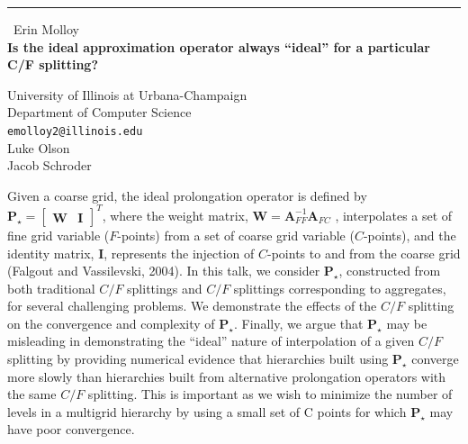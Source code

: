 \documentclass{report}
\begin{document}
\begin{center}
\rule{6in}{1pt} \
{\large Erin Molloy \\
{\bf Is the ideal approximation operator always ``ideal'' for a particular C/F splitting?}}

University of Illinois at Urbana-Champaign \\ Department of Computer Science
\\
{\tt emolloy2@illinois.edu}\\
Luke Olson\\
Jacob Schroder\end{center}

Given a coarse grid, the ideal prolongation operator is defined by
$\mathbf{P}_\star = \begin{bmatrix} \mathbf{W} & \mathbf{I} \end{bmatrix}^T$,
where the weight matrix, $\mathbf{W} = \mathbf{A}_{FF}^{-1} \mathbf{A}_{FC}$ ,
interpolates a set of fine grid variable ($F$-points) from a set of coarse grid variable
($C$-points), and the identity matrix, $\mathbf{I}$, represents the
injection of $C$-points to and from the coarse grid (Falgout and
Vassilevski, 2004).
In this talk, we consider $\mathbf{P}_\star$, constructed from
both traditional $C/F$ splittings and $C/F$ splittings corresponding to
aggregates, for several challenging problems. We demonstrate the effects of the
$C/F$ splitting on the convergence and complexity of $\mathbf{P}_\star$.
Finally, we argue that $\mathbf{P}_\star$ may be misleading in demonstrating the
``ideal'' nature of interpolation of a given $C/F$ splitting by providing
numerical evidence that hierarchies built using $\mathbf{P}_\star$
converge more slowly
than hierarchies built from alternative prolongation operators with the
same $C/F$ splitting. This is important as we wish to minimize the number
of levels in
a multigrid hierarchy by using a small set of C points for which $\mathbf{P}_\star$
may have poor convergence.
\end{document}
